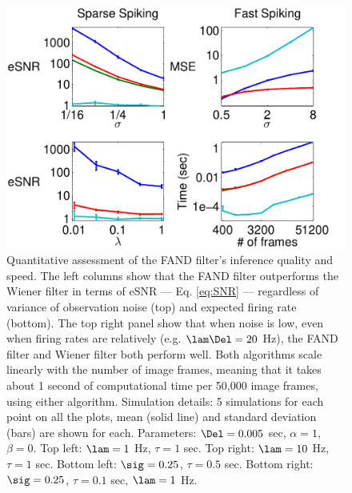 \begin{figure}[H]
\centering \includegraphics[width=.9\linewidth]{../figs/stats}
\caption{Quantitative assessment of the FAND filter's inference quality and speed.  The left columns show that the FAND filter outperforms the Wiener filter in terms of eSNR --- Eq. \eqref{eq:SNR} --- regardless of variance of observation noise (top) and expected firing rate (bottom).  The top right panel show that when noise is low, even when firing rates are relatively (e.g. $\lam \Del=20$ Hz), the FAND filter and Wiener filter both perform well.  Both algorithms scale linearly with the number of image frames, meaning that it takes about 1 second of computational time per 50,000 image frames, using either algorithm.  %
Simulation details: 5 simulations for each point on all the plots, mean (solid line) and standard deviation (bars) are shown for each.  Parameters: $\Del = 0.005$ sec, $\alpha=1$, $\beta=0$.  Top left: $\lam=1$ Hz, $\tau=1$ sec.  Top right: $\lam=10$ Hz, $\tau=1$ sec.  Bottom left: $\sig=0.25$, $\tau=0.5$ sec.  Bottom right: $\sig=0.25$, $\tau=0.1$ sec, $\lam=1$ Hz.} \label{fig:stats}
\end{figure}


